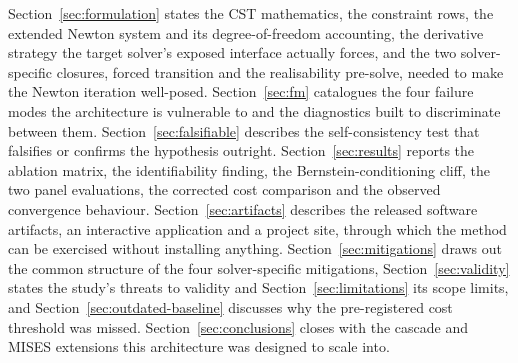 Section~\ref{sec:formulation} states the CST mathematics, the constraint rows,
the extended Newton system and its degree-of-freedom accounting, the
derivative strategy the target solver's exposed interface actually forces, and
the two solver-specific closures, forced transition and the realisability
pre-solve, needed to make the Newton iteration well-posed.
Section~\ref{sec:fm} catalogues the four failure modes the architecture is
vulnerable to and the diagnostics built to discriminate between them.
Section~\ref{sec:falsifiable} describes the self-consistency test that
falsifies or confirms the hypothesis outright. Section~\ref{sec:results}
reports the ablation matrix, the identifiability finding, the
Bernstein-conditioning cliff, the two panel evaluations, the corrected cost
comparison and the observed convergence behaviour.
Section~\ref{sec:artifacts} describes the released software artifacts, an
interactive application and a project site, through which the method can be
exercised without installing anything. Section~\ref{sec:mitigations} draws out
the common structure of the four solver-specific mitigations,
Section~\ref{sec:validity} states the study's threats to validity and
Section~\ref{sec:limitations} its scope limits, and
Section~\ref{sec:outdated-baseline} discusses why the pre-registered cost
threshold was missed. Section~\ref{sec:conclusions} closes with the cascade
and MISES extensions this architecture was designed to scale into.
